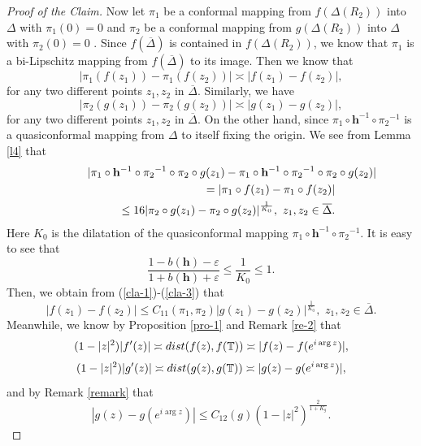 \documentclass[11pt]{amsart}
\theoremstyle{remark}
\theoremstyle{claim}
\theoremstyle{definition}
\theoremstyle{problem}
\theoremstyle{conjecture}
\theoremstyle{question}
\numberwithin{equation}{section}
\begin{document}
\begin{proof}[Proof of the Claim]
Now let $\pi_1$ be a conformal mapping from $f(\Delta(R_2))$ into $\Delta$ with $\pi_1(0)=0$ and $\pi_2$ be a conformal mapping from $g(\Delta(R_2))$ into $\Delta$ with $\pi_2(0)=0$ . Since $f(\overline{\Delta})$ is contained in  $f(\Delta(R_2))$, we know that $\pi_1$ is a bi-Lipschitz mapping from $f(\overline{\Delta})$ to its image.  Then we know that
\begin{equation}\label{cla-1} |{\pi_1}(f(z_1))-{\pi_1}(f(z_2))| \asymp  |f(z_1)-f(z_2)|,\end{equation}
for any two different points $z_1, z_2$ in $\overline{\Delta}$. Similarly, we have
\begin{equation}\label{cla-2}  |{\pi_2}(g(z_1))-{\pi_2}(g(z_2))|\asymp |g(z_1)-g(z_2)|,\end{equation}
for any two different points $z_1, z_2$ in $\overline{\Delta}$. On the other hand, since $\pi_1 \circ {\mathbf{h}}^{-1} \circ {\pi_2}^{-1}$ is a quasiconformal mapping from $\Delta$ to itself fixing the origin.  We see from Lemma \ref{l4} that
\begin{eqnarray}\label{cla-3}
\lefteqn{|\pi_1 \circ {\mathbf{h}}^{-1} \circ {\pi_2}^{-1}\circ {\pi_2}\circ g(z_1)-\pi_1 \circ {\mathbf{h}}^{-1}  \circ {\pi_2}^{-1}\circ {\pi_2}\circ g(z_2)|}\\
&&\quad\quad= |\pi_1 \circ f(z_1)-\pi_1 \circ f(z_2)| \nonumber \\
&&\quad\quad \leq 16 |{\pi_2}\circ g(z_1)-{\pi_2}\circ g(z_2)|^{\frac{1}{{K_0}}},\,\, z_1, z_2 \in \overline{\Delta}. \nonumber
\end{eqnarray}
Here ${K}_0$ is the dilatation of the quasiconformal mapping $\pi_1 \circ {\mathbf{h}}^{-1} \circ {\pi_2}^{-1}$. It is easy to see that
\begin{equation}\label{K}
\frac{1-b(\mathbf{h})-\varepsilon}{1+b(\mathbf{h})+\varepsilon}\leq \frac{1}{{K_0}}\leq 1. \end{equation}
Then, we obtain from (\ref{cla-1})-(\ref{cla-3}) that
\begin{equation}\label{cla-eq}
 |f(z_1)-f(z_2)| \leq C_{11}(\pi_1, \pi_2) |g(z_1)-g(z_2)|^{\frac{1}{{K_0}}}, \,\, z_1, z_2\in \overline{\Delta}.
\end{equation}
Meanwhile, we know by Proposition \ref{pro-1} and Remark \ref{re-2} that
$$(1-|z|^2)|f'(z)| \asymp {\textup{dist}}(f(z), f(\mathbb{T}))\asymp |f(z)-f(e^{i\arg{z}})|, $$
$$(1-|z|^2)|g'(z)| \asymp {\textup{dist}}(g(z), g(\mathbb{T}))\asymp |g(z)-g(e^{i\arg{z}})|, $$
and by Remark \ref{remark} that
\begin{equation}\label{add} |g(z)-g(e^{i\arg z})| \leq C_{12}(g)(1-|z|^2)^{\frac{2}{1+K_{g}}}.\end{equation}

\end{proof}
\end{document}
